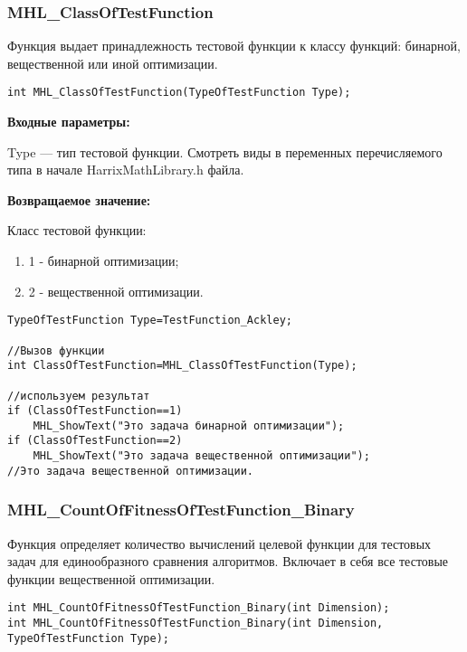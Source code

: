 \documentclass[a4paper,12pt]{article}
\begin{document}
\subsubsection{MHL\_ClassOfTestFunction}\label{MHL_ClassOfTestFunction}

Функция выдает принадлежность тестовой функции к классу функций: бинарной, вещественной или иной оптимизации.


\begin{lstlisting}[label=code_syntax_MHL_ClassOfTestFunction,caption=Синтаксис]
int MHL_ClassOfTestFunction(TypeOfTestFunction Type);
\end{lstlisting}

\textbf{Входные параметры:}

Type --- тип тестовой функции. Смотреть виды в переменных перечисляемого типа в начале HarrixMathLibrary.h файла.

\textbf{Возвращаемое значение:}

Класс тестовой функции:

\begin{enumerate}
\item 1 - бинарной оптимизации;
\item 2 - вещественной оптимизации.
\end{enumerate}


\begin{lstlisting}[label=code_use_MHL_ClassOfTestFunction,caption=Пример использования]
TypeOfTestFunction Type=TestFunction_Ackley;

//Вызов функции
int ClassOfTestFunction=MHL_ClassOfTestFunction(Type);

//используем результат
if (ClassOfTestFunction==1)
    MHL_ShowText("Это задача бинарной оптимизации");
if (ClassOfTestFunction==2)
    MHL_ShowText("Это задача вещественной оптимизации");
//Это задача вещественной оптимизации.
\end{lstlisting}

\subsubsection{MHL\_CountOfFitnessOfTestFunction\_Binary}\label{MHL_CountOfFitnessOfTestFunction_Binary}

Функция определяет количество вычислений целевой функции для тестовых задач для единообразного сравнения алгоритмов. Включает в себя все тестовые функции вещественной оптимизации.


\begin{lstlisting}[label=code_syntax_MHL_CountOfFitnessOfTestFunction_Binary,caption=Синтаксис]
int MHL_CountOfFitnessOfTestFunction_Binary(int Dimension);
int MHL_CountOfFitnessOfTestFunction_Binary(int Dimension, TypeOfTestFunction Type);
\end{lstlisting}
\end{document}
